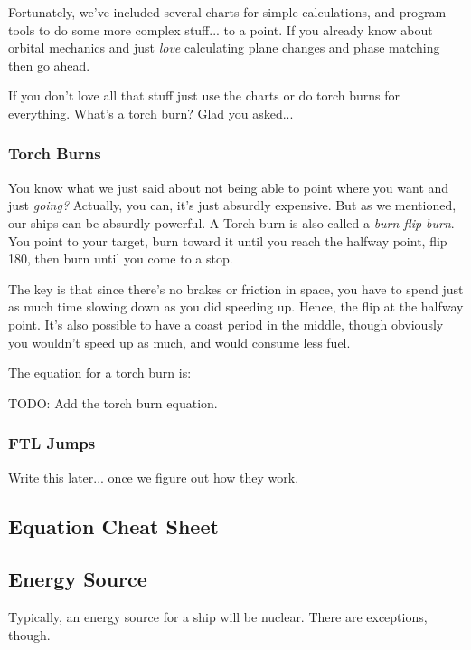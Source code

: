 \par
Fortunately, we've included several charts for simple calculations, and program tools to do some more complex stuff... to a point. If you already know about orbital mechanics and just \textit{love} calculating plane changes and phase matching then go ahead.

\par
If you don't love all that stuff just use the charts or do torch burns for everything. What's a torch burn? Glad you asked...

\subsubsection{Torch Burns}
\par
You know what we just said about not being able to point where you want and just \textit{going?} Actually, you can, it's just absurdly expensive. But as we mentioned, our ships can be absurdly powerful. A Torch burn is also called a \textit{burn-flip-burn}. You point to your target, burn toward it until you reach the halfway point, flip 180\textdegree , then burn until you come to a stop.

\par
The key is that since there's no brakes or friction in space, you have to spend just as much time slowing down as you did speeding up. Hence, the flip at the halfway point. It's also possible to have a coast period in the middle, though obviously you wouldn't speed up as much, and would consume less fuel.

\par
The equation for a torch burn is:

\par
TODO: Add the torch burn equation.

\subsubsection{FTL Jumps}
\par
Write this later... once we figure out how they work.

\subsection{Equation Cheat Sheet}

\subsection{Energy Source}
\par
Typically, an energy source for a ship will be nuclear. There are exceptions, though.

